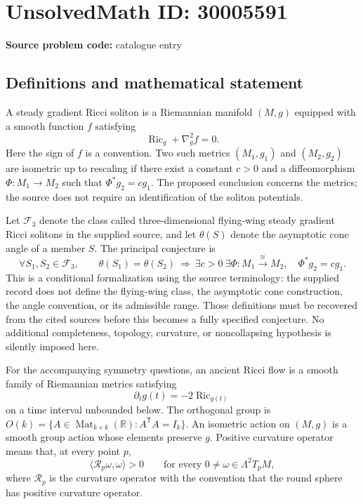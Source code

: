 \documentclass[11pt]{article}
\newcommand{\R}{\mathbb{R}}
\begin{document}
\section*{UnsolvedMath ID: 30005591}
\textbf{Source problem code:} catalogue entry
\subsection{Definitions and mathematical statement}
A steady gradient Ricci soliton is a Riemannian manifold $(M,g)$ equipped with a smooth function $f$ satisfying
\[
\operatorname{Ric}_g+\nabla_g^2 f=0.
\]
Here the sign of $f$ is a convention. Two such metrics $(M_1,g_1)$ and $(M_2,g_2)$ are isometric up to rescaling if there exist a constant $c>0$ and a diffeomorphism $\Phi:M_1\to M_2$ such that $\Phi^*g_2=cg_1$. The proposed conclusion concerns the metrics; the source does not require an identification of the soliton potentials.

Let $\mathcal F_3$ denote the class called three-dimensional flying-wing steady gradient Ricci solitons in the supplied source, and let $\theta(S)$ denote the asymptotic cone angle of a member $S$. The principal conjecture is
\[
\forall S_1,S_2\in\mathcal F_3,\qquad
\theta(S_1)=\theta(S_2)
\ \Longrightarrow\ 
\exists c>0\ \exists\Phi:M_1\xrightarrow{\cong}M_2,
\quad \Phi^*g_2=cg_1.
\]
This is a conditional formalization using the source terminology: the supplied record does not define the flying-wing class, the asymptotic cone construction, the angle convention, or its admissible range. Those definitions must be recovered from the cited sources before this becomes a fully specified conjecture. No additional completeness, topology, curvature, or noncollapsing hypothesis is silently imposed here.

For the accompanying symmetry questions, an ancient Ricci flow is a smooth family of Riemannian metrics satisfying
\[
\partial_t g(t)=-2\operatorname{Ric}_{g(t)}
\]
on a time interval unbounded below. The orthogonal group is $O(k)=\{A\in\operatorname{Mat}_{k\times k}(\R):A^{\mathsf T}A=I_k\}$. An isometric action on $(M,g)$ is a smooth group action whose elements preserve $g$. Positive curvature operator means that, at every point $p$,
\[
\langle\mathcal R_p\omega,\omega\rangle>0
\qquad\text{for every }0\ne\omega\in\Lambda^2T_pM,
\]
where $\mathcal R_p$ is the curvature operator with the convention that the round sphere has positive curvature operator.
\end{document}
